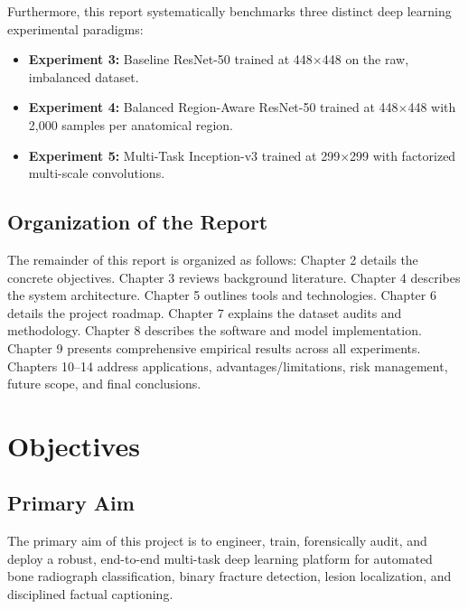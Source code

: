 \documentclass[12pt, a4paper]{report}
\begin{document}
Furthermore, this report systematically benchmarks three distinct deep learning experimental paradigms:
\begin{itemize}
    \item \textbf{Experiment 3:} Baseline ResNet-50 trained at 448$\times$448 on the raw, imbalanced dataset.
    \item \textbf{Experiment 4:} Balanced Region-Aware ResNet-50 trained at 448$\times$448 with 2,000 samples per anatomical region.
    \item \textbf{Experiment 5:} Multi-Task Inception-v3 trained at 299$\times$299 with factorized multi-scale convolutions.
\end{itemize}

\section{Organization of the Report}
The remainder of this report is organized as follows: Chapter 2 details the concrete objectives. Chapter 3 reviews background literature. Chapter 4 describes the system architecture. Chapter 5 outlines tools and technologies. Chapter 6 details the project roadmap. Chapter 7 explains the dataset audits and methodology. Chapter 8 describes the software and model implementation. Chapter 9 presents comprehensive empirical results across all experiments. Chapters 10–14 address applications, advantages/limitations, risk management, future scope, and final conclusions.

\newpage
\chapter{Objectives}

\section{Primary Aim}
The primary aim of this project is to engineer, train, forensically audit, and deploy a robust, end-to-end multi-task deep learning platform for automated bone radiograph classification, binary fracture detection, lesion localization, and disciplined factual captioning.
\end{document}

